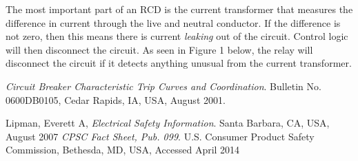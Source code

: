 \documentclass{article}
\begin{document}
\newpage

The most important part of an RCD is the current transformer that measures the
difference in current through the live and neutral conductor. If the
difference is not zero, then this means there is current \emph{leaking} out of
the circuit. Control logic will then disconnect the circuit. As seen in Figure
1 below, the relay will disconnect the circuit if it detects anything unusual
from the current transformer.\cite{safety}


\begin{thebibliography}{9}

  \emph{Circuit Breaker Characteristic Trip Curves and Coordination}.
  Bulletin No. 0600DB0105,
  Cedar Rapids, IA, USA,
  August 2001.

  Lipman, Everett A,
  \emph{Electrical Safety Information}.
  Santa Barbara, CA, USA,
  August 2007
  \emph{CPSC Fact Sheet, Pub. 099}.
  U.S. Consumer Product Safety Commission,
  Bethesda, MD, USA,
  Accessed April 2014
\end{thebibliography}
\end{document}

